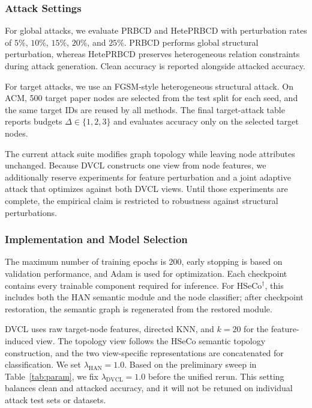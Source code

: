 \subsubsection{Attack Settings}

For global attacks, we evaluate PRBCD and HetePRBCD with perturbation rates of $5\%$, $10\%$, $15\%$, $20\%$, and $25\%$. PRBCD performs global structural perturbation, whereas HetePRBCD preserves heterogeneous relation constraints during attack generation. Clean accuracy is reported alongside attacked accuracy.

For target attacks, we use an FGSM-style heterogeneous structural attack. On ACM, 500 target paper nodes are selected from the test split for each seed, and the same target IDs are reused by all methods. The final target-attack table reports budgets $\Delta\in\{1,2,3\}$ and evaluates accuracy only on the selected target nodes.

The current attack suite modifies graph topology while leaving node attributes unchanged. Because DVCL constructs one view from node features, we additionally reserve experiments for feature perturbation and a joint adaptive attack that optimizes against both DVCL views. Until those experiments are complete, the empirical claim is restricted to robustness against structural perturbations.

\subsubsection{Implementation and Model Selection}

The maximum number of training epochs is 200, early stopping is based on validation performance, and Adam is used for optimization. Each checkpoint contains every trainable component required for inference. For HSeCo$^{\dagger}$, this includes both the HAN semantic module and the node classifier; after checkpoint restoration, the semantic graph is regenerated from the restored module.

DVCL uses raw target-node features, directed KNN, and $k=20$ for the feature-induced view. The topology view follows the HSeCo semantic topology construction, and the two view-specific representations are concatenated for classification. We set $\lambda_{\mathrm{HAN}}=1.0$. Based on the preliminary sweep in Table~\ref{tab:param}, we fix $\lambda_{\mathrm{DVCL}}=1.0$ before the unified rerun. This setting balances clean and attacked accuracy, and it will not be retuned on individual attack test sets or datasets.

